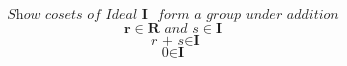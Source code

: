 \documentclass[10pt]{article}
\begin{document}
$$\textit{Show cosets of Ideal}\textbf{ I }\textit{ form a group under addition}$$
$$\textbf{r}\in\textbf{R}\textit{ and }\textit{s}\in\textbf{I}$$
$$\textit{ r + s}\in\textbf{I}$$
$$\textit{0}\in\textbf{I}$$
\end{document}
